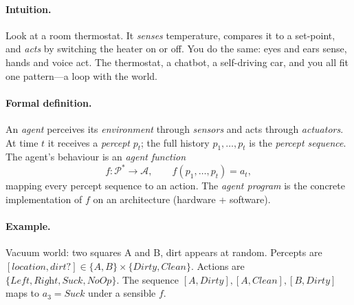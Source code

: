 \paragraph{Intuition.} Look at a room thermostat. It \emph{senses} temperature, compares it to a set-point, and \emph{acts} by switching the heater on or off. You do the same: eyes and ears sense, hands and voice act. The thermostat, a chatbot, a self-driving car, and you all fit one pattern---a loop with the world.

\paragraph{Formal definition.} An \emph{agent} perceives its \emph{environment} through \emph{sensors} and acts through \emph{actuators}. At time $t$ it receives a \emph{percept} $p_t$; the full history $p_1,\dots,p_t$ is the \emph{percept sequence}. The agent's behaviour is an \emph{agent function}
\[
f: \mathcal{P}^* \to \mathcal{A},\qquad f(p_1,\dots,p_t)=a_t,
\]
mapping every percept sequence to an action. The \emph{agent program} is the concrete implementation of $f$ on an architecture (hardware + software).

\paragraph{Example.} Vacuum world: two squares A and B, dirt appears at random. Percepts are $[\textit{location},\textit{dirt?}]\in\{A,B\}\times\{\textit{Dirty},\textit{Clean}\}$. Actions are $\{\textit{Left},\textit{Right},\textit{Suck},\textit{NoOp}\}$. The sequence $[A,\textit{Dirty}],[A,\textit{Clean}],[B,\textit{Dirty}]$ maps to $a_3=\textit{Suck}$ under a sensible $f$.

